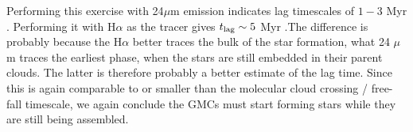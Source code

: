 Performing this exercise with 24$\mu$m emission indicates lag timescales of $1-3$ Myr \citep{tamburro08a}. Performing it with H$\alpha$ as the tracer gives $t_{\rm lag}\sim 5$ Myr \citep{egusa04a}.The difference is probably because the H$\alpha$ better traces the bulk of the star formation, what 24 $\mu$m traces the earliest phase, when the stars are still embedded in their parent clouds. The latter is therefore probably a better estimate of the lag time. Since this is again comparable to or smaller than the molecular cloud crossing / free-fall timescale, we again conclude the GMCs must start forming stars while they are still being assembled.

